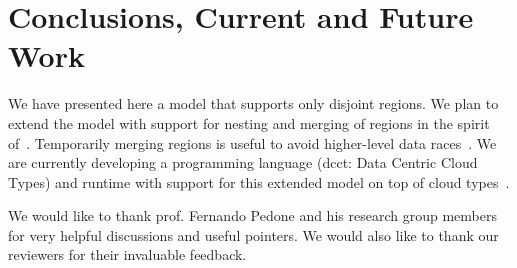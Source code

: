 \documentclass[preprint,numbers]{sigplanconf}
\begin{document}
\section{Conclusions, Current and Future Work}
\label{sec:conclusion}
We have presented here a model that supports only disjoint regions. We plan to
extend the model with support for nesting and merging of regions in the spirit of~\cite{dolby2012data}.
Temporarily merging regions is useful to avoid higher-level data races~\cite{artho2003high}. We are
currently developing a programming language (dcct: Data Centric Cloud Types) and runtime with 
support for this extended model on top of cloud
types~\cite{burckhardt2012cloud}.


\acks We would like to thank prof. Fernando Pedone and his research group
members for very helpful discussions and useful pointers. We would also like to
thank our reviewers for their invaluable feedback.







\end{document}
